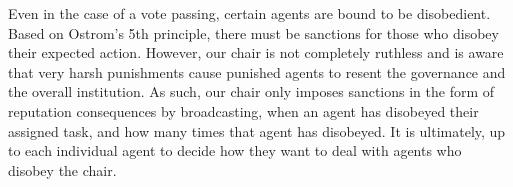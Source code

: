 \par Even in the case of a vote passing, certain agents are bound to be disobedient. Based on Ostrom’s 5th principle, there must be sanctions for those who disobey their expected action. However, our chair is not completely ruthless and is aware that very harsh punishments cause punished agents to resent the governance and the overall institution. As such, our chair only imposes sanctions in the form of reputation consequences by broadcasting, when an agent has disobeyed their assigned task, and how many times that agent has disobeyed. It is ultimately, up to each individual agent to decide how they want to deal with agents who disobey the chair.  


